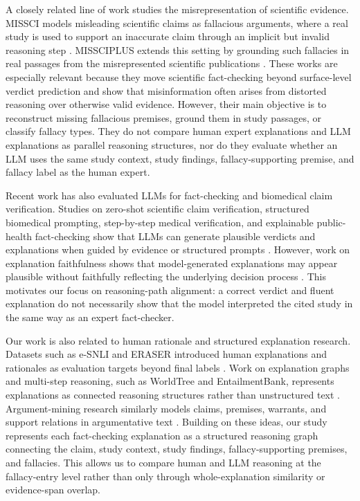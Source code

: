 \documentclass[11pt]{article}
\begin{document}
A closely related line of work studies the misrepresentation of scientific evidence. MISSCI models misleading scientific claims as fallacious arguments, where a real study is used to support an inaccurate claim through an implicit but invalid reasoning step \citep{glockner-etal-2024-missci}. MISSCIPLUS extends this setting by grounding such fallacies in real passages from the misrepresented scientific publications \citep{glockner-etal-2025-grounding}. These works are especially relevant because they move scientific fact-checking beyond surface-level verdict prediction and show that misinformation often arises from distorted reasoning over otherwise valid evidence. However, their main objective is to reconstruct missing fallacious premises, ground them in study passages, or classify fallacy types. They do not compare human expert explanations and LLM explanations as parallel reasoning structures, nor do they evaluate whether an LLM uses the same study context, study findings, fallacy-supporting premise, and fallacy label as the human expert.

Recent work has also evaluated LLMs for fact-checking and biomedical claim verification. Studies on zero-shot scientific claim verification, structured biomedical prompting, step-by-step medical verification, and explainable public-health fact-checking show that LLMs can generate plausible verdicts and explanations when guided by evidence or structured prompts \citep{alvarez2024zero,liang2025advancing,vladika2025step,zarharan2024tell,tan2025improving}. However, work on explanation faithfulness shows that model-generated explanations may appear plausible without faithfully reflecting the underlying decision process \citep{turpin2023language,atanasova2023faithfulness,parcalabescu2024measuring}. This motivates our focus on reasoning-path alignment: a correct verdict and fluent explanation do not necessarily show that the model interpreted the cited study in the same way as an expert fact-checker.

Our work is also related to human rationale and structured explanation research. Datasets such as e-SNLI and ERASER introduced human explanations and rationales as evaluation targets beyond final labels \citep{camburu2018esnli,deyoung2020eraser}. Work on explanation graphs and multi-step reasoning, such as WorldTree and EntailmentBank, represents explanations as connected reasoning structures rather than unstructured text \citep{jansen2018worldtree,xie2020worldtree,dalvi2021explaining}. Argument-mining research similarly models claims, premises, warrants, and support relations in argumentative text \citep{lawrence2019argument}. Building on these ideas, our study represents each fact-checking explanation as a structured reasoning graph connecting the claim, study context, study findings, fallacy-supporting premises, and fallacies. This allows us to compare human and LLM reasoning at the fallacy-entry level rather than only through whole-explanation similarity or evidence-span overlap.
\end{document}
